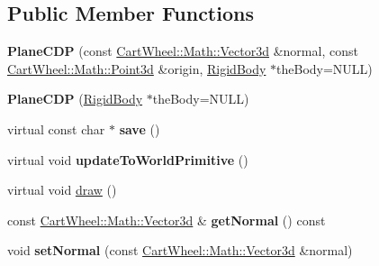 \subsection*{Public Member Functions}
\begin{DoxyCompactItemize}
\item 
\hypertarget{classCartWheel_1_1Physics_1_1PlaneCDP_ac0c320820cb88066f83c9391a901627f}{
{\bfseries PlaneCDP} (const \hyperlink{classCartWheel_1_1Math_1_1Vector3d}{CartWheel::Math::Vector3d} \&normal, const \hyperlink{classCartWheel_1_1Math_1_1Point3d}{CartWheel::Math::Point3d} \&origin, \hyperlink{classCartWheel_1_1Physics_1_1RigidBody}{RigidBody} $\ast$theBody=NULL)}
\label{classCartWheel_1_1Physics_1_1PlaneCDP_ac0c320820cb88066f83c9391a901627f}

\item 
\hypertarget{classCartWheel_1_1Physics_1_1PlaneCDP_a9f2fdd634570bd6153b1edf8098191f9}{
{\bfseries PlaneCDP} (\hyperlink{classCartWheel_1_1Physics_1_1RigidBody}{RigidBody} $\ast$theBody=NULL)}
\label{classCartWheel_1_1Physics_1_1PlaneCDP_a9f2fdd634570bd6153b1edf8098191f9}

\item 
\hypertarget{classCartWheel_1_1Physics_1_1PlaneCDP_a8abf323a62acb71f0f7509fc6496c71f}{
virtual const char $\ast$ {\bfseries save} ()}
\label{classCartWheel_1_1Physics_1_1PlaneCDP_a8abf323a62acb71f0f7509fc6496c71f}

\item 
\hypertarget{classCartWheel_1_1Physics_1_1PlaneCDP_abb56b68c0d71819ee4ac3d5315db430e}{
virtual void {\bfseries updateToWorldPrimitive} ()}
\label{classCartWheel_1_1Physics_1_1PlaneCDP_abb56b68c0d71819ee4ac3d5315db430e}

\item 
virtual void \hyperlink{classCartWheel_1_1Physics_1_1PlaneCDP_af05d808b4b8c86c3737bbe05ee624cd9}{draw} ()
\item 
\hypertarget{classCartWheel_1_1Physics_1_1PlaneCDP_a4f301f2c95cd1cf8ea3a560f6686a368}{
const \hyperlink{classCartWheel_1_1Math_1_1Vector3d}{CartWheel::Math::Vector3d} \& {\bfseries getNormal} () const }
\label{classCartWheel_1_1Physics_1_1PlaneCDP_a4f301f2c95cd1cf8ea3a560f6686a368}

\item 
\hypertarget{classCartWheel_1_1Physics_1_1PlaneCDP_a35eb772d7904f8b070063e62a6e8d013}{
void {\bfseries setNormal} (const \hyperlink{classCartWheel_1_1Math_1_1Vector3d}{CartWheel::Math::Vector3d} \&normal)}
\label{classCartWheel_1_1Physics_1_1PlaneCDP_a35eb772d7904f8b070063e62a6e8d013}


\end{DoxyCompactItemize}
